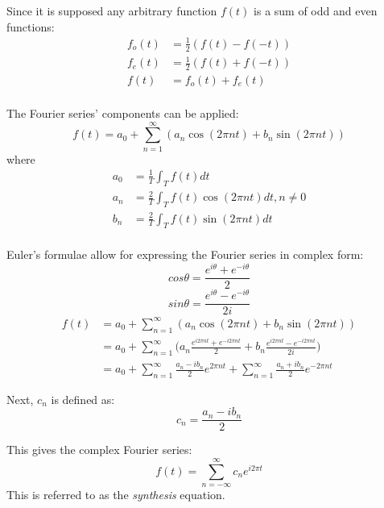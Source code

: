 \documentclass{article}
\begin{document}
Since it is supposed any arbitrary function $f(t)$ is a sum of odd and even 
functions:
\begin{align*}
	f_o(t) &= \frac{1}{2}(f(t) - f(-t)) \\
	f_e(t) &= \frac{1}{2}(f(t) + f(-t)) \\
	f(t) &= f_o(t) + f_e(t) \\
\end{align*}

The Fourier series' components can be applied:
$$f(t) = a_0 + \sum^{\infty}_{n=1} (a_n \cos(2 \pi n t) + b_n \sin(2 \pi n t))$$
where
\begin{align*}
	a_0 &= \frac{1}{T} \int_T f(t) dt \\
	a_n &= \frac{2}{T} \int_T f(t) \cos(2 \pi n t) dt, n \neq 0 \\
	b_n &= \frac{2}{T} \int_T f(t) \sin(2 \pi n t) dt \\
\end{align*}

Euler's formulae allow for expressing the Fourier series in complex form:
$$cos \theta = \frac{e^{i\theta} + e^{-i\theta}}{2}$$
$$sin \theta = \frac{e^{i\theta} - e^{-i\theta}}{2i}$$
\begin{equation*}
	\begin{aligned}
		f(t) &=
		a_0 + \sum^{\infty}_{n=1}(a_n \cos(2 \pi n t) + b_n \sin(2 \pi n t)) \\
		& = a_0 + \sum^{\infty}_{n=1}\Big(
		a_n \frac{e^{i 2 \pi n t} + e^{-i 2 \pi n t}}{2} + 
		b_n \frac{e^{i 2 \pi n t} - e^{-i 2 \pi n t}}{2i}\Big) \\
		&= a_0 + \sum^{\infty}_{n=1} \frac{a_n - ib_n}{2}e^{2 \pi n t} +
		\sum^{\infty}_{n=1} \frac{a_n + ib_n}{2} e^{-2 \pi n t}
	\end{aligned}
\end{equation*}

Next, $c_n$ is defined as:
$$c_n = \frac{a_n - i b_n}{2}$$

This gives the complex Fourier series:
\begin{equation*}
	f(t) = \sum^{\infty}_{n = - \infty} c_n e^{i 2 \pi t}
\end{equation*}
This is referred to as the \textit{synthesis} equation.
\end{document}
